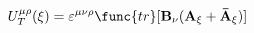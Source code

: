 \begin{equation}
U_T^{\mu \rho }(\xi )=\varepsilon ^{\mu \nu \rho }\func{tr} [{\bf
B}_{\nu }({\bf A}_{\xi }+{\bf \bar{A}}_{\xi })]  \label{eqn:20}
\end{equation}

